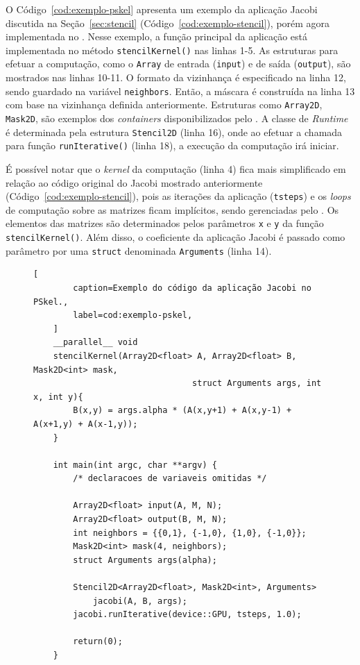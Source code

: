 O Código~\ref{cod:exemplo-pskel} apresenta um exemplo da aplicação Jacobi discutida na
Seção~\ref{sec:stencil} (Código~\ref{cod:exemplo-stencil}), porém agora implementada no \fw \pskel.
Nesse exemplo, a função \stencil principal da aplicação está implementada no método \texttt{stencilKernel()} nas linhas 1-5.
As estruturas para efetuar a computação, como o \texttt{Array} de entrada (\texttt{input}) e de saída (\texttt{output}), são mostrados nas linhas 10-11.
O formato da vizinhança é especificado na linha 12, sendo guardado na variável \texttt{neighbors}.
Então, a máscara é construída na linha 13 com base na vizinhança definida anteriormente.
Estruturas como \texttt{Array2D}, \texttt{Mask2D}, são exemplos dos
\textit{containers} disponibilizados pelo \fw. A classe de \textit{Runtime} é
determinada pela estrutura \texttt{Stencil2D} (linha 16), onde ao efetuar a chamada para
função \texttt{runIterative()} (linha 18), a execução da computação irá iniciar.


É possível notar que o \textit{kernel} da computação \stencil (linha 4) fica mais simplificado em relação ao
código original do Jacobi mostrado anteriormente (Código~\ref{cod:exemplo-stencil}), pois as iterações da aplicação
(\texttt{tsteps}) e os \textit{loops} de computação sobre as matrizes ficam implícitos, sendo
gerenciadas pelo \fw. Os elementos das matrizes são determinados pelos
parâmetros \texttt{x} e \texttt{y} da função \texttt{stencilKernel()}. Além disso, o coeficiente
da aplicação Jacobi é passado como parâmetro por uma \texttt{struct} denominada
\texttt{Arguments} (linha 14).

\begin{figure}[t]
	\begin{lstlisting}[
		caption=Exemplo do código da aplicação Jacobi no PSkel.,
		label=cod:exemplo-pskel,
	]
	__parallel__ void
	stencilKernel(Array2D<float> A, Array2D<float> B, Mask2D<int> mask,
								struct Arguments args, int x, int y){
		B(x,y) = args.alpha * (A(x,y+1) + A(x,y-1) + A(x+1,y) + A(x-1,y));
	}

	int main(int argc, char **argv) {
		/* declaracoes de variaveis omitidas */

		Array2D<float> input(A, M, N);
		Array2D<float> output(B, M, N);
		int neighbors = {{0,1}, {-1,0}, {1,0}, {-1,0}};
		Mask2D<int> mask(4, neighbors);
		struct Arguments args(alpha);

		Stencil2D<Array2D<float>, Mask2D<int>, Arguments>
			jacobi(A, B, args);
		jacobi.runIterative(device::GPU, tsteps, 1.0);

		return(0);
	}
\end{lstlisting}
\end{figure}
